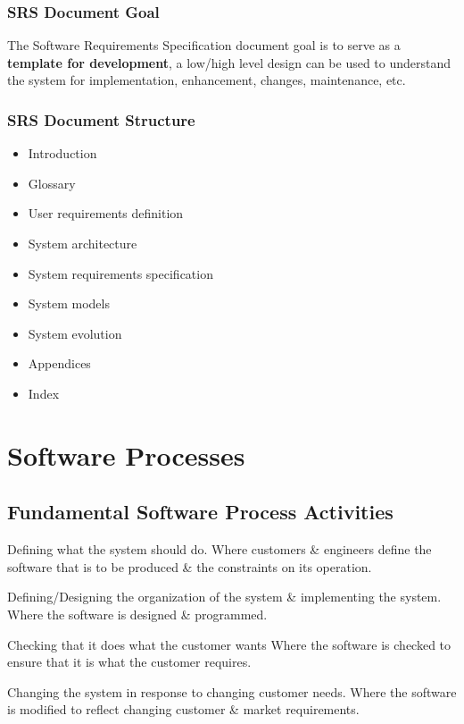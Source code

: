 \documentclass{report}
\newcommand{\textr}[1]{\textcolor{red}{#1}}
\begin{document}
\begin{multicols}{2}
\subsection{SRS Document Goal}
\noindent The Software Requirements Specification document goal is to serve as a \textbf{template for development}, a low/high level design can be used to understand the system for implementation, enhancement, changes, maintenance, etc.\newline
\vfill\columnbreak
\subsection{SRS Document Structure}
\begin{itemize}
  \item Introduction
  \item Glossary
  \item User requirements definition
  \item System architecture
  \item System requirements specification
  \item System models
  \item System evolution
  \item Appendices
  \item Index
\end{itemize}
\end{multicols}



\chapter{Software Processes}
\section{Fundamental Software Process Activities}
\begin{description}[style=multiline,leftmargin=12em]
  \item [\textr{Software specification}] Defining what the system should do.\newline
  Where customers \& engineers
define the software that is to be produced \& the constraints on its operation.
  \item [\textr{Software development}] Defining/Designing the organization of the
system \& implementing the system.\newline
  Where the software is designed \& programmed.
  \item [\textr{Software validation}] Checking that it does what the customer wants\newline
  Where the software is checked to ensure that it is what the customer requires.
  \item [\textr{Software evolution}] Changing the system in response to changing customer needs.\newline
  Where the software is modified to reflect changing customer \& market requirements.
\end{description}
\end{document}
